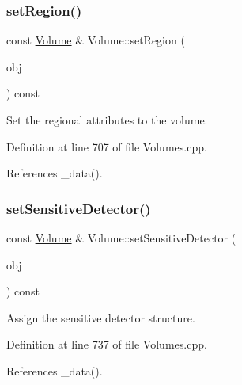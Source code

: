 \subsubsection{\texorpdfstring{set\+Region()}{setRegion()}\hspace{0.1cm}{\footnotesize\ttfamily [2/2]}}
{\footnotesize\ttfamily const \hyperlink{class_d_d4hep_1_1_geometry_1_1_volume}{Volume} \& Volume\+::set\+Region (\begin{DoxyParamCaption}\item[{const \hyperlink{class_d_d4hep_1_1_geometry_1_1_region}{Region} \&}]{obj }\end{DoxyParamCaption}) const}



Set the regional attributes to the volume. 



Definition at line 707 of file Volumes.\+cpp.



References \+\_\+data().

\hypertarget{class_d_d4hep_1_1_geometry_1_1_volume_a06a520c22504fac9688544011c19744e}{}\label{class_d_d4hep_1_1_geometry_1_1_volume_a06a520c22504fac9688544011c19744e} 
\subsubsection{\texorpdfstring{set\+Sensitive\+Detector()}{setSensitiveDetector()}}
{\footnotesize\ttfamily const \hyperlink{class_d_d4hep_1_1_geometry_1_1_volume}{Volume} \& Volume\+::set\+Sensitive\+Detector (\begin{DoxyParamCaption}\item[{const \hyperlink{class_d_d4hep_1_1_geometry_1_1_sensitive_detector}{Sensitive\+Detector} \&}]{obj }\end{DoxyParamCaption}) const}



Assign the sensitive detector structure. 



Definition at line 737 of file Volumes.\+cpp.



References \+\_\+data().



